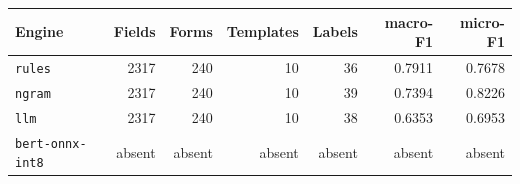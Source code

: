 \begingroup\small\setlength{\tabcolsep}{4pt}
\begin{tabular}{lrrrrrr}
\toprule
\textbf{Engine} & \textbf{Fields} & \textbf{Forms} & \textbf{Templates} & \textbf{Labels} & \textbf{macro-F1} & \textbf{micro-F1} \\  %
\midrule
\texttt{rules} & 2317 & 240 & 10 & 36 & 0.7911 & 0.7678 \\  %
\texttt{ngram} & 2317 & 240 & 10 & 39 & 0.7394 & 0.8226 \\  %
\texttt{llm} & 2317 & 240 & 10 & 38 & 0.6353 & 0.6953 \\  %
\midrule
\texttt{bert-onnx-int8} & absent & absent & absent & absent & absent & absent \\  %
\bottomrule
\end{tabular}
\endgroup
\par\smallskip{}
